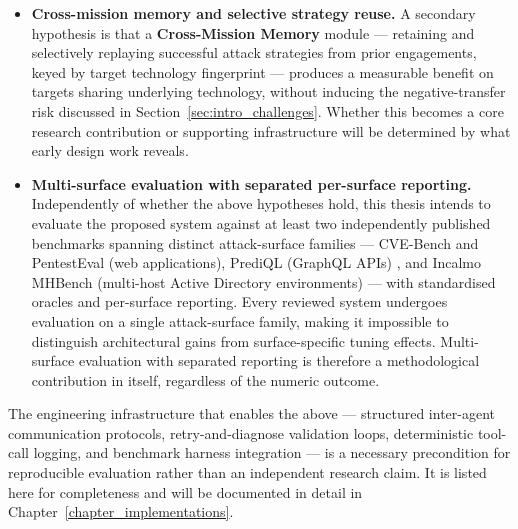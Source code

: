 \begin{itemize}
	\item \textbf{Cross-mission memory and selective strategy reuse.} A secondary hypothesis is that a \textbf{Cross-Mission Memory} module --- retaining and selectively replaying successful attack strategies from prior engagements, keyed by target technology fingerprint --- produces a measurable benefit on targets sharing underlying technology, without inducing the negative-transfer risk discussed in Section~\ref{sec:intro_challenges}. Whether this becomes a core research contribution or supporting infrastructure will be determined by what early design work reveals.

	\item \textbf{Multi-surface evaluation with separated per-surface reporting.} Independently of whether the above hypotheses hold, this thesis intends to evaluate the proposed system against at least two independently published benchmarks spanning distinct attack-surface families --- CVE-Bench and PentestEval (web applications), PrediQL (GraphQL APIs) \citep{liu2025prediql}, and Incalmo MHBench (multi-host Active Directory environments) \citep{singer2025incalmo} --- with standardised oracles and per-surface reporting. Every reviewed system undergoes evaluation on a single attack-surface family, making it impossible to distinguish architectural gains from surface-specific tuning effects. Multi-surface evaluation with separated reporting is therefore a methodological contribution in itself, regardless of the numeric outcome.
\end{itemize}

The engineering infrastructure that enables the above --- structured inter-agent communication protocols, retry-and-diagnose validation loops, deterministic tool-call logging, and benchmark harness integration --- is a necessary precondition for reproducible evaluation rather than an independent research claim. It is listed here for completeness and will be documented in detail in Chapter~\ref{chapter_implementations}.
